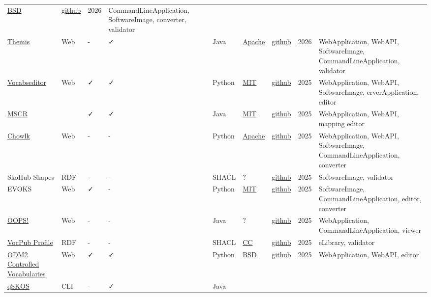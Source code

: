 \documentclass[
  DIV=10]{article}
\begin{document}
\begin{longtable}[]{@{}lllllllll@{}}
\href{https://spdx.org/licenses/BSD-3-Clause}{BSD} &
\href{https://github.com/INCATools/ontology-development-kit}{github} &
2026 & CommandLineApplication, SoftwareImage, converter, validator \\
\href{http://themis.linkeddata.es/}{Themis} & Web & - & ✓ & Java &
\href{https://spdx.org/licenses/Apache-2.0}{Apache} &
\href{https://github.com/oeg-upm/Themis}{github} & 2026 &
WebApplication, WebAPI, SoftwareImage, CommandLineApplication,
validator \\
\href{https://vocabseditor.acdh.oeaw.ac.at/}{Vocabseditor} & Web & ✓ & ✓
& Python & \href{https://spdx.org/licenses/MIT}{MIT} &
\href{https://github.com/acdh-oeaw/vocabseditor}{github} & 2025 &
WebApplication, WebAPI, SoftwareImage, erverApplication, editor \\
\href{https://cscfi.github.io/mscr-docs/}{MSCR} & & ✓ & ✓ & Java &
\href{https://spdx.org/licenses/MIT}{MIT} &
\href{https://github.com/CSCfi/mscr-compose}{github} & 2025 &
WebApplication, WebAPI, mapping editor \\
\href{https://chowlk.linkeddata.es/}{Chowlk} & Web & - & - & Python &
\href{https://spdx.org/licenses/Apache-2.0}{Apache} &
\href{https://github.com/oeg-upm/Chowlk}{github} & 2025 &
WebApplication, WebAPI, SoftwareImage, CommandLineApplication,
converter \\
SkoHub Shapes & RDF & - & - & SHACL & ? &
\href{https://github.com/skohub-io/skohub-shapes}{github} & 2025 &
SoftwareImage, validator \\
EVOKS & Web & ✓ & - & Python & \href{https://spdx.org/licenses/MIT}{MIT}
& \href{https://github.com/kit-data-manager/EVOKS}{github} & 2025 &
SoftwareImage, CommandLineApplication, editor, converter \\
\href{https://oops.linkeddata.es/}{OOPS!} & Web & - & - & Java & ? &
\href{https://github.com/oeg-upm/OOPS}{github} & 2025 & WebApplication,
CommandLineApplication, viewer \\
\href{https://surroundaustralia.github.io/vocpub-profile/profile.html}{VocPub
Profile} & RDF & - & - & SHACL &
\href{https://spdx.org/licenses/CC-BY-4.0}{CC} &
\href{https://github.com/AGLDWG/vocpub-profile/}{github} & 2025 &
eLibrary, validator \\
\href{http://vocabulary.odm2.org/}{ODM2 Controlled Vocabularies} & Web &
✓ & ✓ & Python & \href{https://spdx.org/licenses/BSD-3-Clause}{BSD} &
\href{https://github.com/ODM2/ODM2ControlledVocabularies}{github} & 2025
& WebApplication, WebAPI, editor \\
\href{https://github.com/cmader/qSKOS/}{qSKOS} & CLI & - & ✓ & Java &

\end{longtable}
\end{document}
